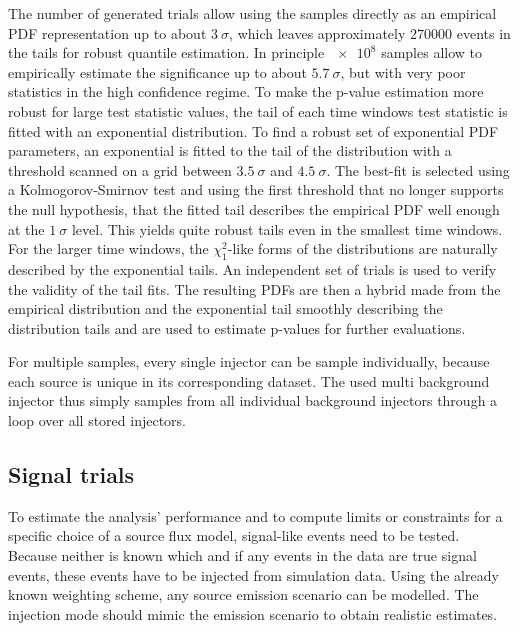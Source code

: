 The number of generated trials allow using the samples directly as an empirical PDF representation up to about $\SI{3}{\sigma}$, which leaves approximately $\num{270000}$ events in the tails for robust quantile estimation.
In principle $\num{e8}$ samples allow to empirically estimate the significance up to about $\SI{5.7}{\sigma}$, but with very poor statistics in the high confidence regime.
To make the p-value estimation more robust for large test statistic values, the tail of each time windows test statistic is fitted with an exponential distribution.
To find a robust set of exponential PDF parameters, an exponential is fitted to the tail of the distribution with a threshold scanned on a grid between $\SI{3.5}{\sigma}$ and $\SI{4.5}{\sigma}$.
The best-fit is selected using a Kolmogorov-Smirnov test  and using the first threshold that no longer supports the null hypothesis, that the fitted tail describes the empirical PDF well enough at the $\SI{1}{\sigma}$ level.
This yields quite robust tails even in the smallest time windows.
For the larger time windows, the $\chi^2_1$-like forms of the distributions are naturally described by the exponential tails.
An independent set of trials is used to verify the validity of the tail fits.
The resulting PDFs are then a hybrid made from the empirical distribution and the exponential tail smoothly describing the distribution tails and are used to estimate p-values for further evaluations.

For multiple samples, every single injector can be sample individually, because each source is unique in its corresponding dataset.
The used multi background injector thus simply samples from all individual background injectors through a loop over all stored injectors.


\subsection*{Signal trials}
To estimate the analysis' performance and to compute limits or constraints for a specific choice of a source flux model, signal-like events need to be tested.
Because neither is known which and if any events in the data are true signal events, these events have to be injected from simulation data.
Using the already known weighting scheme, any source emission scenario can be modelled.
The injection mode should mimic the emission scenario to obtain realistic estimates.

